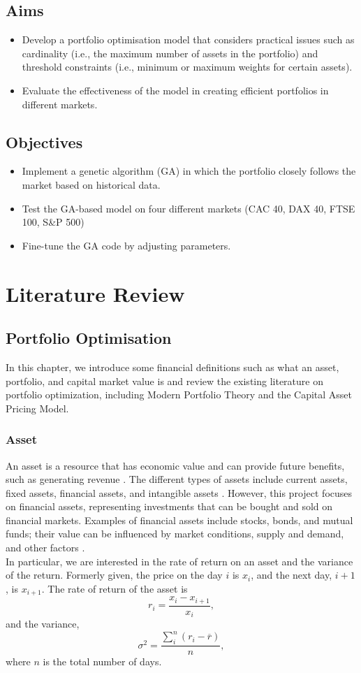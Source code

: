 \documentclass[12pt]{report}
\begin{document}
\section*{Aims}
\begin{itemize}
    \item  Develop a portfolio optimisation model that considers practical issues such as cardinality (i.e., the maximum number of assets in the portfolio) and threshold constraints (i.e., minimum or maximum weights for certain assets).
    \item Evaluate the effectiveness of the model in creating efficient portfolios in different markets.
\end{itemize}
\section*{Objectives}
\begin{itemize}
    \item Implement a genetic algorithm (GA) in which the portfolio closely follows the market based on historical data.
    \item Test the GA-based model on four different markets (CAC 40, DAX 40, FTSE 100, S\&P 500)
    \item Fine-tune the GA code by adjusting parameters.
\end{itemize}

\chapter{Literature Review}
\section{Portfolio Optimisation}
In this chapter, we introduce some financial definitions such as what an asset, portfolio, and capital market value is and review the existing literature on portfolio optimization, including Modern Portfolio Theory and the Capital Asset Pricing Model.
\subsection{Asset}
An asset is a resource that has economic value and can provide future benefits, such as generating revenue \cite{asset}. The different types of assets include current assets, fixed assets, financial assets, and intangible assets \cite{asset}. However, this project focuses on financial assets, representing investments that can be bought and sold on financial markets. Examples of financial assets include stocks, bonds, and mutual funds; their value can be influenced by market conditions, supply and demand, and other factors \cite{asset}.\\ \newline
\noindent
In particular, we are interested in the rate of return on an asset and the variance of the return. Formerly given, the price on the day $i$ is $x_i$, and the next day, $i+1$, is $x_{i+1}$. The rate of return of the asset is $$r_i = \frac{x_i-x_{i+1}}{x_i},$$ and the variance, $$\sigma^2 = \frac{\sum_i^n (r_i - \overline{r})}{n},$$ where $n$ is the total number of days.
\end{document}
